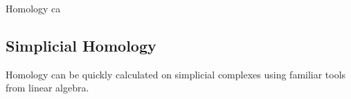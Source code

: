 Homology ca

\subsection{Simplicial Homology}\label{subsec:simpl-hom}

Homology can be quickly calculated on simplicial complexes using familiar tools from linear algebra.


%     


%     




